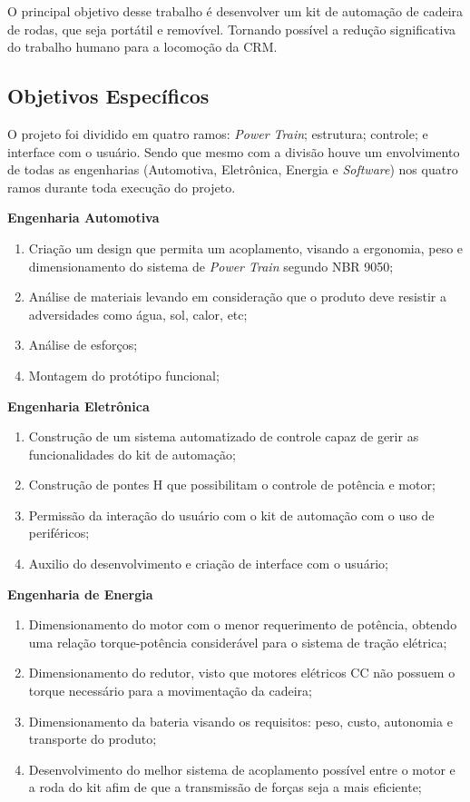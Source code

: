 O principal objetivo desse trabalho é desenvolver um kit de automação de cadeira de rodas, que seja portátil e removível. Tornando possível a redução significativa do trabalho humano para a locomoção da CRM.

\subsection{Objetivos Específicos}

O projeto foi dividido em quatro ramos: \textit{Power Train}; estrutura; controle; e interface com o usuário. Sendo que mesmo com a divisão houve um envolvimento de todas as engenharias (Automotiva, Eletrônica, Energia e \textit{Software}) nos quatro ramos durante toda execução do projeto.

\textbf{Engenharia Automotiva}

  \begin{enumerate}
    \item Criação um design que permita um acoplamento, visando a ergonomia, peso e dimensionamento do sistema de \textit{Power Train} segundo NBR 9050;
    \item Análise de materiais levando em consideração que o produto deve resistir a adversidades como água, sol, calor, etc;
    \item Análise de esforços;
    \item Montagem do protótipo funcional;
  \end{enumerate}

\textbf{Engenharia Eletrônica}
  \begin{enumerate}
    \item Construção de um sistema automatizado de controle capaz de gerir as funcionalidades do kit de automação;
    \item Construção de pontes H que possibilitam o controle de potência e motor;
    \item Permissão da interação do usuário com o kit de automação com o uso de periféricos;
    \item Auxilio do desenvolvimento e criação de interface com o usuário;
  \end{enumerate}

\textbf{Engenharia de Energia}
  \begin{enumerate}
    \item Dimensionamento do motor com o menor requerimento de potência, obtendo uma relação torque-potência considerável para o sistema de tração elétrica;
    \item Dimensionamento do redutor, visto que motores elétricos CC não possuem o torque necessário para a movimentação da cadeira;
    \item Dimensionamento da bateria visando os requisitos: peso, custo, autonomia e transporte do produto;
    \item Desenvolvimento do melhor sistema de acoplamento possível entre o motor e a roda do kit afim de que a transmissão de forças seja a mais eficiente;
  \end{enumerate}

